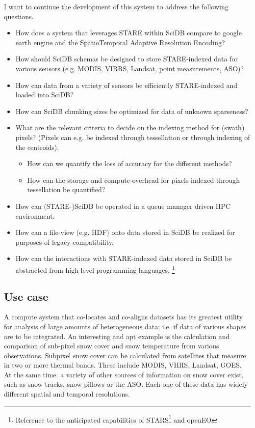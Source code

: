 \documentclass[a4paper,10pt]{article}
\begin{document}
I want to continue the development of this system to address the following questions.
\begin{itemize}
 \item How does a system that leverages STARE within SciDB compare to google earth engine and the SpatioTemporal Adaptive Resolution Encoding?
 \item How should SciDB schemas be designed to store STARE-indexed data for various sensors (e.g. MODIS, VIRRS, Landsat, point measurements, ASO)?
 \item How can data from a variety of sensors be efficiently STARE-indexed and loaded into SciDB?
 \item How can SciDB chunking sizes be optimized for data of unknown sparseness?
 \item What are the relevant criteria to decide on the indexing method for (swath) pixels? (Pixels can e.g. be indexed through tessellation or through indexing of the centroids).
 \begin{itemize}    
    \item How can we quantify the loss of accuracy for the different methods?
    \item How can the storage and compute overhead for pixels indexed through tessellation be quantified?
 \end{itemize} 
 \item How can (STARE-)SciDB be operated in a queue manager driven \gls{HPC} environment.
 \item How can a file-view (e.g. \gls{HDF}) onto data stored in SciDB be realized for purposes of legacy compatibility.
 \item How can the interactions with STARE-indexed data stored in SciDB be abstracted from high level programming languages. \footnote{Reference to the 
 anticipated capabilities of STARS\footnote{\url{https://github.com/r-spatial/stars}} and openEO}
\end{itemize}

\subsection{Use case}
A compute system that co-locates and co-aligns datasets has its greatest utility for
analysis of large amounts of heterogeneous data; i.e. if data of various shapes are to be integrated. An interesting and apt example is the calculation and comparison of sub-pixel snow cover and snow temperature from various observations.
Subpixel snow cover can be calculated from satellites that measure in two or more thermal bands. These include MODIS, VIIRS, Landsat, GOES.
At the same time. a variety of other sources of information on snow cover exist, such as snow-tracks, snow-pillows or the \gls{ASO}.
Each one of these data has widely different spatial and temporal resolutions.
\end{document}
